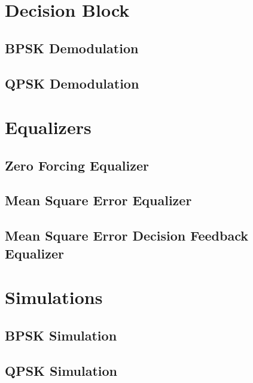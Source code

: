 \documentclass[]{article}
\begin{document}
\section{Decision Block}
\label{app:dblocks}
\subsection{BPSK Demodulation}
\label{app:bpsk_demod}


\subsection{QPSK Demodulation}
\label{app:qpsk_demod}


\section{Equalizers}
\label{app:equal}

\subsection{Zero Forcing Equalizer}
\label{app:zf}


\subsection{Mean Square Error Equalizer}
\label{app:mse}


\subsection{Mean Square Error Decision Feedback Equalizer}
\label{app:dfe}


\section{Simulations}
\subsection{BPSK Simulation}


\subsection{QPSK Simulation}

\end{document}
